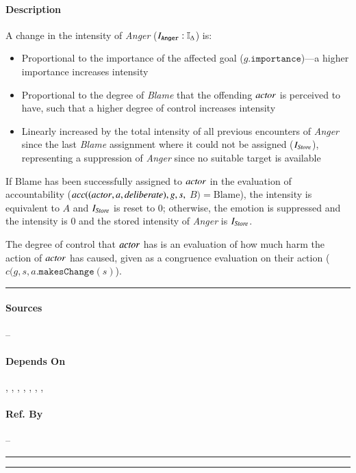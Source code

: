 \paragraph{Description} A change in the intensity of \textit{Anger}
($I_{\mathtt{Anger}} : \mathbb{I}_{\Delta}$) is:
\begin{itemize}
    \item Proportional to the importance of the affected goal
    ($g.\mathtt{importance}$)---a higher importance increases intensity

    \item Proportional to the degree of \textit{Blame} that the offending
    $\mathit{actor}$ is perceived to have, such that a higher degree of control
    increases intensity

    \item Linearly increased by the total intensity of all previous encounters
    of \textit{Anger} since the last \textit{Blame} assignment where it could
    not be assigned ($I_{\mathit{Store}}$), representing a suppression of
    \textit{Anger} since no suitable target is available
\end{itemize}

If Blame has been successfully assigned to $\mathit{actor}$ in the evaluation of
accountability ($acc((\mathit{actor}, a,\allowbreak \mathit{deliberate}), g, s,$ $B) = 
\text{Blame}$), the intensity is equivalent to $A$ and $I_{\mathit{Store}}$ is reset 
to $0$; otherwise, the emotion is suppressed and the intensity is $0$ and the 
stored intensity of \textit{Anger} is $I_{\mathit{Store}}$.

The degree of control that $\mathit{actor}$ has is an evaluation of how much harm the
action of $\mathit{actor}$ has caused, given as a congruence evaluation on their
action ($c(g, s, a.\mathtt{makesChange}(s)$). \\\hrule

\paragraph{Sources} --

\paragraph{Depends On} , , 
, , , 
, , 

\paragraph{Ref. By} -- \\\hrule\vspace{0.5mm}\hrule


